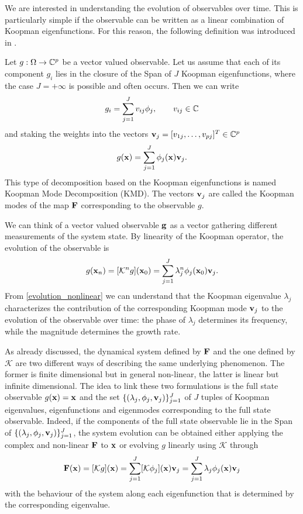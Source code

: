 We are interested in understanding the evolution of observables over time. This is particularly simple if the observable can be written as a linear combination of Koopman eigenfunctions. For this reason, the following definition was introduced in \cite{rowley_spectral_2009}.
\begin{definition}
Let $g:\Omega\to\mathbb{C}^p$ be a vector valued observable. Let us assume that each of its component $g_i$ lies in the closure of the Span of $J$ Koopman eigenfunctions, where the case $J=+\infty$ is possible and often occurs. Then we can write 
\begin{equation*}
	g_i = \sum_{j = 1}^J v_{ij}\phi_j, \qquad v_{ij}\in\mathbb{C}
\end{equation*}
and staking the weights into the vectors $\vb{v}_j = [v_{1j},\dots,v_{pj}]^T\in\mathbb{C}^p$ 
\begin{equation}
    \label{koopman_modes}
	g(\vb{x}) = \sum_{j = 1}^J \phi_j(\vb{x})\vb{v}_{j}.
\end{equation}
This type of decomposition based on the Koopman eigenfunctions is named Koopman Mode Decomposition (KMD). The vectors $\vb{v}_j$ are called the Koopman modes of the map $\vb{F}$ corresponding to the observable $g$. 
\end{definition}

We can think of a vector valued observable $\vb{g}$ as a vector gathering different measurements of the system state. By linearity of the Koopman operator, the evolution of the observable is
\begin{equation}
	\label{evolution_nonlinear}
	g(\vb{x}_n) = [\mathcal{K}^ng](\vb{x}_0) = \sum_{j = 1}^J \lambda_j^n\phi_j(\vb{x}_0)\vb{v}_{j}.
\end{equation}
From \eqref{evolution_nonlinear} we can understand that the Koopman eigenvalue $\lambda_j$ characterizes the contribution of the corresponding Koopman mode $\vb{v}_j$ to the evolution of the observable over time: the phase of $\lambda_j$ determines its frequency, while the magnitude determines the growth rate.

As already discussed, the dynamical system defined by $\vb{F}$ and the one defined by $\mathcal{K}$ are two different ways of describing the same underlying phenomenon. The former is finite dimensional but in general non-linear, the latter is linear but infinite dimensional. The idea to link these two formulations is the full state observable $g(\vb{x}) = \vb{x}$ and the set $\{(\lambda_j, \phi_j, \vb{v}_j)\}_{j = 1}^J$ of $J$ tuples of Koopman eigenvalues, eigenfunctions and eigenmodes corresponding to the full state observable. Indeed, if the components of the full state observable lie in the Span of $\{(\lambda_j, \phi_j, \vb{v}_j)\}_{j = 1}^J$, the system evolution can be obtained either applying the complex and non-linear $\vb{F}$ to $\vb{x}$ or evolving $g$ linearly using $\mathcal{K}$ through
\begin{equation*}
	\vb{F}(\vb{x}) = [\mathcal{K}g](\vb{x}) = \sum_{j = 1}^J [\mathcal{K}\phi_j](\vb{x})\vb{v}_j = \sum_{j = 1}^J \lambda_j\phi_j(\vb{x})\vb{v}_j
\end{equation*}
with the behaviour of the system along each eigenfunction that is determined by the corresponding eigenvalue.